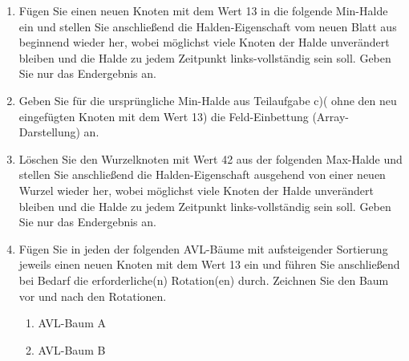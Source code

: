\documentclass{lehramt-informatik-aufgabe}
\begin{document}
\begin{enumerate}
\begin{liAntwort}
\begin{minipage}{0.5\linewidth}
\end{minipage}
\begin{minipage}{0.5\linewidth}
\end{minipage}
\end{liAntwort}


\item Fügen Sie einen neuen Knoten mit dem Wert 13 in die folgende
Min-Halde ein und stellen Sie anschließend die Halden-Eigenschaft vom
neuen Blatt aus beginnend wieder her, wobei möglichst viele Knoten der
Halde unverändert bleiben und die Halde zu jedem Zeitpunkt
links-vollständig sein soll. Geben Sie nur das Endergebnis an.


\item Geben Sie für die ursprüngliche Min-Halde aus Teilaufgabe c)(\dh
ohne den neu eingefügten Knoten mit dem Wert 13) die Feld-Einbettung
(Array-Darstellung) an.


\item Löschen Sie den Wurzelknoten mit Wert 42 aus der folgenden
Max-Halde und stellen Sie anschließend die Halden-Eigenschaft ausgehend
von einer neuen Wurzel wieder her, wobei möglichst viele Knoten der
Halde unverändert bleiben und die Halde zu jedem Zeitpunkt
links-vollständig sein soll. Geben Sie nur das Endergebnis an.


\item Fügen Sie in jeden der folgenden AVL-Bäume mit aufsteigender
Sortierung jeweils einen neuen Knoten mit dem Wert 13 ein und führen Sie
anschließend bei Bedarf die erforderliche(n) Rotation(en) durch.
Zeichnen Sie den Baum vor und nach den Rotationen.

\begin{enumerate}


\item AVL-Baum A


\item AVL-Baum B
\end{enumerate}
\end{enumerate}
\end{document}
